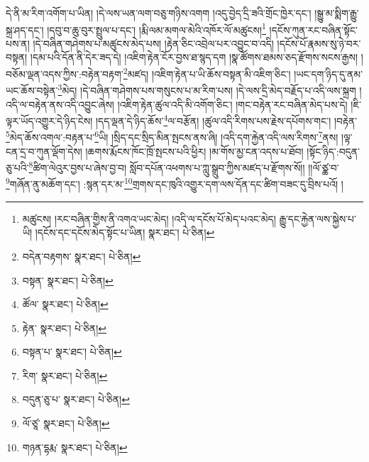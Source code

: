 དེ་ནི་མ་རིག་འགོག་པ་ཡིན། །དེ་ལས་ཡན་ལག་བཅུ་གཉིས་འགག །འདུ་བྱེད་དྲི་ཟའི་གྲོང་ཁྱེར་དང་། །སྒྱུ་མ་སྨིག་རྒྱུ་སྐྲ་ཤད་དང་། །དབུ་བ་ཆུ་བུར་སྤྲུལ་པ་དང་། །རྨི་ལམ་མགལ་མེའི་འཁོར་ལོ་མཚུངས།\footnote{མཚུངས། །རང་བཞིན་གྱིས་ནི་འགའ་ཡང་མེད། །འདི་ལ་དངོས་པོ་མེད་པའང་མེད། རྒྱུ་དང་རྐྱེན་ལས་སྐྱེས་པ་ཡི། །དངོས་དང་དངོས་མེད་སྟོང་པ་ཡིན།  སྣར་ཐང་།  པེ་ཅིན། } །དངོས་ཀུན་རང་བཞིན་སྟོང་པས་ན། །དེ་བཞིན་གཤེགས་པ་མཚུངས་མེད་པས། །རྟེན་ཅིང་འབྲེལ་པར་འབྱུང་བ་འདི། །དངོས་པོ་རྣམས་སུ་ཉེ་བར་བསྟན། །དམ་པའི་དོན་ནི་དེར་ཟད་དེ། །འཇིག་རྟེན་ངོར་བྱས་ཐ་སྙད་དག །སྣ་ཚོགས་ཐམས་ཅད་རྫོགས་སངས་རྒྱས། །བཅོམ་ལྡན་འདས་ཀྱིས་:བརྟེན་བརྟག་\footnote{བདེན་བརྟགས་  སྣར་ཐང་།  པེ་ཅིན། }མཛད། །འཇིག་རྟེན་པ་ཡི་ཆོས་བསྟན་མི་འཇིག་ཅིང་། །ཡང་དག་ཉིད་དུ་ནམ་ཡང་ཆོས་བསྟེན་\footnote{བསྟན་  སྣར་ཐང་།  པེ་ཅིན། }མེད། །དེ་བཞིན་གཤེགས་པས་གསུངས་པ་མ་རིག་པས། །དེ་ལས་དྲི་མེད་བརྗོད་པ་འདི་ལས་སྐྲག །འདི་ལ་བརྟེན་ནས་འདི་འབྱུང་ཞེས། །འཇིག་རྟེན་ཚུལ་འདི་མི་འགོག་ཅིང་། །གང་བརྟེན་རང་བཞིན་མེད་པས་དེ། །ཇི་ལྟར་ཡོད་འགྱུར་དེ་ཉིད་ངེས། །དད་ལྡན་དེ་ཉིད་ཆོས་\footnote{ཚོལ་  སྣར་ཐང་།  པེ་ཅིན། }ལ་བརྩོན། །ཚུལ་འདི་རིགས་པས་རྗེས་དཔོགས་གང་། །བརྟེན་\footnote{རྟེན་  སྣར་ཐང་།  པེ་ཅིན། }མེད་ཆོས་འགལ་:བརྟན་པ་\footnote{བསྟན་པ་  སྣར་ཐང་།  པེ་ཅིན། }ཡི། །སྲིད་དང་སྲིད་མིན་སྤངས་ནས་ཞི། །འདི་དག་རྐྱེན་འདི་ལས་རིགས་\footnote{རིག་  སྣར་ཐང་།  པེ་ཅིན། }ནས། །ལྟ་ངན་དྲ་བ་ཀུན་ལྡོག་དེས། །ཆགས་རྨོངས་ཁོང་ཁྲོ་སྤངས་པའི་ཕྱིར། །མ་གོས་མྱ་ངན་འདས་པ་ཐོབ། །སྟོང་ཉིད་:བདུན་ཅུ་པའི་\footnote{བདུན་ཅུ་པ་  སྣར་ཐང་།  པེ་ཅིན། }ཚིག་ལེའུར་བྱས་པ་ཞེས་བྱ་བ། སློབ་དཔོན་འཕགས་པ་ཀླུ་སྒྲུབ་ཀྱིས་མཛད་པ་རྫོགས་སོ།། །།ལོ་ཙྪ་བ་\footnote{ལོ་ཙཱ་  སྣར་ཐང་།  པེ་ཅིན། }གཞོན་ནུ་མཆོག་དང་། :སྙན་དར་མ་\footnote{གཉན་དྷརྨ་  སྣར་ཐང་།  པེ་ཅིན། }གྲགས་དང་ཁུའི་འགྱུར་དག་ལས་དོན་དང་ཚིག་བཟང་དུ་བྲིས་པའོ། ། 